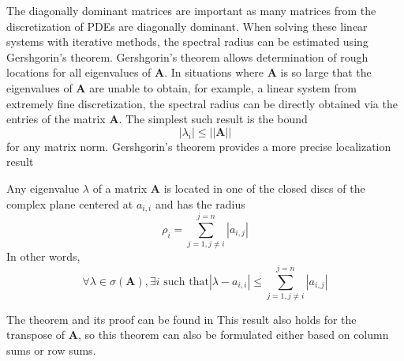 The diagonally dominant matrices are important as many matrices from the discretization of PDEs are diagonally dominant. When solving these linear systems with iterative methods, the spectral radius can be estimated using Gershgorin's theorem. Gershgorin's theorem allows determination of rough locations for all eigenvalues of $\boldsymbol{A}$. 
In situations where $\boldsymbol{A}$ is so large that the eigenvalues of $\boldsymbol{A}$ are unable to obtain, for example, a linear system from extremely fine discretization, the spectral radius can be directly obtained via the entries of the matrix $\boldsymbol{A}$. The simplest such result is the bound \begin{equation}
    |\lambda_i| \leq ||\boldsymbol{A}||
\end{equation}
for any matrix norm. Gershgorin's theorem provides a more precise localization result
\begin{theorem}[Gershgorin]
Any eigenvalue $\lambda$ of a matrix $\boldsymbol{A}$ is located in one of the closed discs of the complex plane centered at $a_{i, i}$ and has the radius
\begin{equation}
    \rho_i = \sum_{j = 1, j \neq i}^{j=n}|a_{i,j}|
\end{equation}
In other words,
\begin{equation}
    \forall \lambda \in \sigma(\boldsymbol{A}), \exists  i \text{ such that} |\lambda - a_{i,i}| \leq \sum_{j = 1, j \neq i}^{j = n}|a_{i,j}|
\end{equation}
\end{theorem}
The theorem and its proof can be found in \cite{doi:10.1137/1.9780898718003}
This result also holds for the transpose of $\boldsymbol{A}$, so this theorem can also be formulated either based on column sums or row sums.
